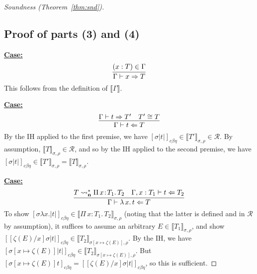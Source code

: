 \documentclass{article}
\newcommand{\choice}[0]{\zeta}
\newcommand{\abs}[4]{{#1}\, #2\! : \! #3.\, #4}
\newcommand{\absu}[3]{{#1}\, #2.\, #3}
\newcommand{\interp}[1]{\llbracket #1 \rrbracket}
\newcommand{\leadstocs}[0]{\ensuremath{\leadsto_{\mathbf{n}}^*}}
\newcommand{\tpcheck}[0]{\Leftarrow}
\newcommand{\tpsynth}[0]{\Rightarrow}
\newcommand{\cbe}[0]{c\beta\eta}
\newcommand{\startcase}[1]{\vspace{#1} \noindent\textbf{\underline{Case:}}}
\begin{document}
\begin{proof}[Soundness (Theorem~\ref{thm:snd})]
\subsection{Proof of parts (3) and (4)}

\startcase{.2cm}
\[
    \infer{\Gamma\vdash x\tpsynth T}{(x : T)\in\Gamma} 
\]
This follows from the definition of $\interp{\Gamma}$.



\startcase{.2cm}
\[
  \infer{\Gamma\vdash t\tpcheck T}{\Gamma\vdash t\tpsynth T' & T' \cong T}
\]
By the IH applied to the first premise, we have 
$[\sigma|t|]_{\cbe}\in\interp{T'}_{\sigma,\rho}\in\mathcal{R}$. By assumption, $\interp{T}_{\sigma,\rho}\in\mathcal{R}$,
and so by the IH applied to the second premise, we have $[\sigma|t|]_{\cbe}\in\interp{T'}_{\sigma,\rho} = \interp{T}_{\sigma,\rho}$.

\startcase{.2cm}
\[
  \infer{\Gamma\vdash \absu{\lambda}{x}{t} \tpcheck T}{T \leadstocs \abs{\Pi}{x}{T_1}{T_2} & \Gamma,x:T_1\vdash t\tpcheck T_2}
\]
To show $[\sigma \lambda
x.|t|]_{\cbe}\in\interp{\abs{\Pi}{x}{T_1}{T_2}}_{\sigma,\rho}$ (noting that the
latter is defined and in $\mathcal{R}$ by assumption), it suffices to assume an
arbitrary $E\in\interp{T_1}_{\sigma,\rho}$, and show
$[[\choice(E)/x]\sigma|t|]_{\cbe}\in\interp{T_2}_{\sigma[x\mapsto\choice(E)],\rho}$.
By the IH, we have
$[\sigma[x\mapsto\choice(E)]|t|]_{\cbe}\in\interp{T_2}_{\sigma[x\mapsto\choice(E)],\rho}$.
But $[\sigma[x\mapsto\choice(E)]t]_{\cbe} = [[\choice(E)/x]\sigma|t|]_{\cbe}$,
so this is sufficient.


\end{proof}
\end{document}
